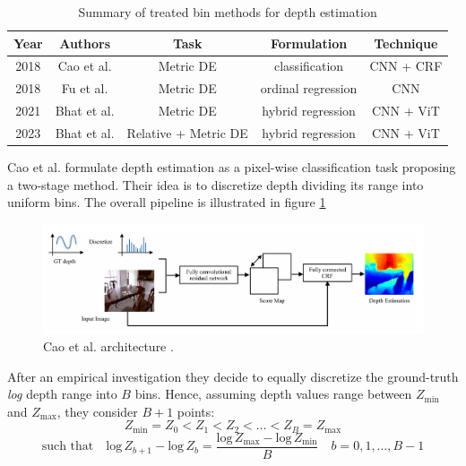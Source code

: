 \begin{center}
\begin{table}
\begin{tabular}{| c | c | c | c | c |}
\hline
\textbf{Year} & \textbf{Authors} & \textbf{Task} & \textbf{Formulation} & \textbf{Technique} \\
\hline
2018 &  Cao et al. \cite{depth_as_classification} & Metric DE & classification & CNN + CRF \\
2018 & Fu et al. \cite{ordinal_regression} & Metric DE & ordinal regression & CNN \\
2021 & Bhat et al. \cite{AdaBins} & Metric DE & hybrid regression & CNN + ViT\\
2023 & Bhat et al. \cite{ZoeDepth} & Relative + Metric DE & hybrid regression & CNN + ViT\\
\hline
\end{tabular}
\caption{Summary of treated bin methods for depth estimation}
\label{table:2}
\end{table}
\end{center}

Cao et al. \cite{depth_as_classification} formulate depth estimation as a pixel-wise classification task proposing a two-stage method.
Their idea is to discretize depth dividing its range into uniform bins.
The overall pipeline is illustrated in figure \ref{fig:depth_as_classification}

\begin{figure}
	\centering
	\includegraphics[scale=0.5]{figs/depth_classification}
	\caption{Cao et al. architecture \cite{depth_as_classification}. \label{fig:depth_as_classification}}
\end{figure}

After an empirical investigation they decide to equally discretize the ground-truth \textit{log} depth range into $B$ bins.
Hence, assuming depth values range between $Z_{\text{min}}$ and $Z_{\text{max}}$, they consider $B+1$ points:
\[
	Z_{\text{min}}=Z_{0} < Z_{1} < Z_{2} < \dotsc < Z_{B} = Z_{\text{max}}
\]\[
	\text{such that} \quad \text{log} \, Z_{b+1} - \text{log} \, Z_{b} =
	\frac{\text{log} \, Z_{\text{max}} - \text{log} \, Z_{\text{min}}}{B}
	\quad b = 0, 1, \dotsc, B-1
\]

